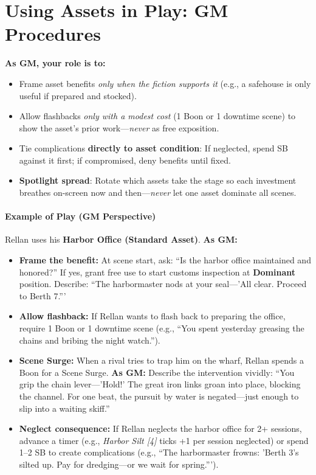 \section{Using Assets in Play: GM Procedures}
\label{sec:using-assets}
\textbf{As GM, your role is to:}  
\begin{itemize}
  \item Frame asset benefits \emph{only when the fiction supports it} (e.g., a safehouse is only useful if prepared and stocked).  
  \item Allow flashbacks \emph{only with a modest cost} (1 Boon or 1 downtime scene) to show the asset's prior work---\emph{never} as free exposition.  
  \item Tie complications \textbf{directly to asset condition}: If neglected, spend SB against it first; if compromised, deny benefits until fixed.  
  \item \textbf{Spotlight spread}: Rotate which assets take the stage so each investment breathes on-screen now and then---\emph{never} let one asset dominate all scenes.  
\end{itemize}

\paragraph{Example of Play (GM Perspective)}
Rellan uses his \textbf{Harbor Office (Standard Asset)}. \textbf{As GM:}  
\begin{itemize}
  \item \textbf{Frame the benefit:} At scene start, ask: ``Is the harbor office maintained and honored?'' If yes, grant free use to start customs inspection at \textbf{Dominant} position. Describe: ``The harbormaster nods at your seal---'All clear. Proceed to Berth 7.'''  
  \item \textbf{Allow flashback:} If Rellan wants to flash back to preparing the office, require 1 Boon or 1 downtime scene (e.g., ``You spent yesterday greasing the chains and bribing the night watch.'').  
  \item \textbf{Scene Surge:} When a rival tries to trap him on the wharf, Rellan spends a Boon for a Scene Surge. \textbf{As GM:} Describe the intervention vividly: ``You grip the chain lever---'Hold!' The great iron links groan into place, blocking the channel. For one beat, the pursuit by water is negated---just enough to slip into a waiting skiff.''  
  \item \textbf{Neglect consequence:} If Rellan neglects the harbor office for 2+ sessions, advance a timer (e.g., \emph{Harbor Silt [4]} ticks +1 per session neglected) or spend 1--2 SB to create complications (e.g., ``The harbormaster frowns: 'Berth 3's silted up. Pay for dredging---or we wait for spring.''').  
\end{itemize}


